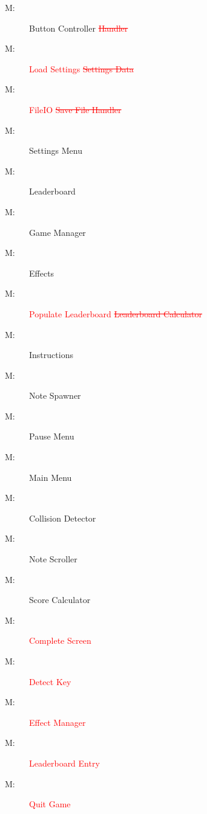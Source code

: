 \documentclass[12pt, titlepage]{article}
\newcounter{mnum}
\newcommand{\mthemnum}{M\themnum}
\begin{document}
\begin{description}
\item [ \mthemnum \label{m1}:] Button Controller \textcolor{red}{\sout{Handler}}
\item [ \mthemnum \label{m2}:] \textcolor{red}{Load Settings} \textcolor{red}{\sout{Settings Data}}
\item [ \mthemnum \label{m3}:]  \textcolor{red}{FileIO} \textcolor{red}{\sout{Save File Handler}}
\item [ \mthemnum \label{m4}:] Settings Menu
\item [ \mthemnum \label{m5}:] Leaderboard

\item [ \mthemnum \label{m6}:] Game Manager
\item [ \mthemnum \label{m7}:] Effects
\item [ \mthemnum \label{m8}:]  \textcolor{red}{Populate Leaderboard} \textcolor{red}{\sout{Leaderboard Calculator}} 
\item [ \mthemnum \label{m9}:] Instructions
\item [ \mthemnum \label{m10}:] Note Spawner
\item [ \mthemnum \label{m11}:] Pause Menu
\item [ \mthemnum \label{m12}:] Main Menu
\item [ \mthemnum \label{m13}:] Collision Detector
\item [ \mthemnum \label{m14}:] Note Scroller
\item [ \mthemnum \label{m15}:] Score Calculator
\item [ \mthemnum \label{m16}:]  \textcolor{red}{Complete Screen}
\item [ \mthemnum \label{m17}:]  \textcolor{red}{Detect Key}
\item [ \mthemnum \label{m18}:]  \textcolor{red}{Effect Manager}
\item [ \mthemnum \label{m19}:]  \textcolor{red}{Leaderboard Entry}
\item [ \mthemnum \label{m20}:]  \textcolor{red}{Quit Game}
\end{description}
\end{document}
